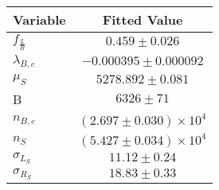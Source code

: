 \begin{tabular}[t]{lc}
\hline
Variable &Fitted Value\\
\hline\hline
$f_{\frac{L}{R}}$&$0.459\pm0.026$\\
\hline
$\lambda_{B,c}$&$-0.000395\pm0.000092$\\
\hline
$\mu_S$&$5278.892\pm0.081$\\
\hline
B&$6326\pm71$\\
\hline
$n_{B,c}$&$(2.697\pm0.030)\times 10^4$\\
\hline
$n_S$&$(5.427\pm0.034)\times 10^4$\\
\hline
$\sigma_{L_S}$&$11.12\pm0.24$\\
\hline
$\sigma_{R_S}$&$18.83\pm0.33$\\
\hline
\end{tabular}